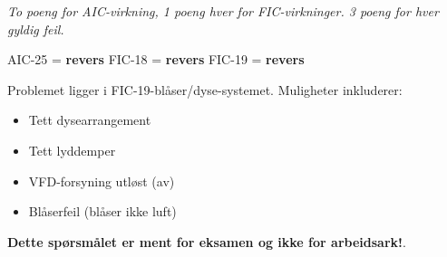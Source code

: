 



{\it To poeng for AIC-virkning, 1 poeng hver for FIC-virkninger. 3 poeng for hver gyldig feil.}

\vskip 10pt

AIC-25 = {\bf revers} \hskip 50pt FIC-18 = {\bf revers} \hskip 50pt FIC-19 = {\bf revers}

\vskip 10pt

Problemet ligger i FIC-19-blåser/dyse-systemet. Muligheter inkluderer:

\begin{itemize}
\item{} Tett dysearrangement
\item{} Tett lyddemper
\item{} VFD-forsyning utløst (av)
\item{} Blåserfeil (blåser ikke luft)
\end{itemize}







{\bf Dette spørsmålet er ment for eksamen og ikke for arbeidsark!}.



